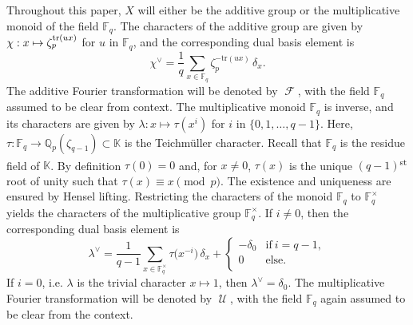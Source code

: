 \documentclass[12pt]{article}
\newcommand{\F}{\mathbb{F}}
\newcommand{\QQ}{\mathbb{Q}}
\newcommand{\K}{\mathbb{K}}
\newcommand{\tr}{\mathrm{tr}}
\newcommand{\dual}{\vee}
\DeclareMathOperator{\FT}{\mathscr{F}}
\DeclareMathOperator{\UT}{\mathscr{U}}
\begin{document}
Throughout this paper, $X$ will either be the additive group or the multiplicative monoid of the field $\F_q$. The characters of the additive group are given by $\chi : x \mapsto \smash{\zeta_p^{\tr(ux)}}$ for $u$ in $\F_q$, and the corresponding dual basis element is
\begin{equation*}
\chi^\dual = \frac{1}{q}\sum_{x \in \F_q} \zeta_p^{-\tr(ux)}\,\delta_x.
\end{equation*}
The additive Fourier transformation will be denoted by $\FT$, with the field $\F_q$ assumed to be clear from context.
The multiplicative monoid $\F_q$ is inverse, and its characters are given by $\lambda : x \mapsto \tau(x^i)$ for $i$ in $\{0, 1, \ldots, q - 1\}$. Here, $\tau : \F_q \to \QQ_p(\zeta_{q - 1}) \subset \K$ is the Teichm\"uller character. Recall that $\F_q$ is the residue field of $\K$. By definition $\tau(0) = 0$ and, for $x \neq 0$, $\tau(x)$ is the unique $(q - 1)$\textsuperscript{st} root of unity such that $\tau(x) \equiv x \pmod{p}$. The existence and uniqueness are ensured by Hensel lifting. Restricting the characters of the monoid $\F_q$ to $\F_q^\times$ yields the characters of the multiplicative group $\F_q^\times$.
If $i \neq 0$, then the corresponding dual basis element is
\begin{equation*}
\lambda^\dual = \frac{1}{q - 1} \sum_{x \in \F_q^\times} \tau\big(x^{-i}\big)\,\delta_x + \begin{cases}
-\delta_0  & \text{if}~i = q - 1, \\
0          & \text{else}. \\
\end{cases}
\end{equation*}
If $i = 0$, i.e. $\lambda$ is the trivial character $x \mapsto 1$, then $\lambda^\dual = \delta_0$. The multiplicative Fourier transformation will be denoted by $\UT$, with the field $\F_q$ again assumed to be clear from the context.
\end{document}
